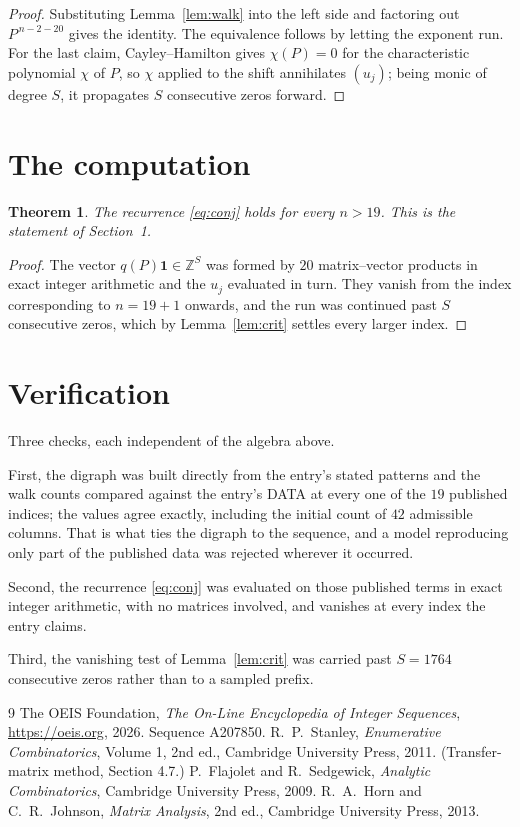 \documentclass[11pt,a4paper]{article}
\theoremstyle{plain}
\newtheorem{theorem}{Theorem}
\theoremstyle{definition}
\begin{document}
\begin{proof}
Substituting Lemma~\ref{lem:walk} into the left side and factoring out
$P^{\,n-2-20}$ gives the identity. The equivalence follows by letting the exponent
run. For the last claim, Cayley--Hamilton gives $\chi(P)=0$ for the characteristic
polynomial $\chi$ of $P$, so $\chi$ applied to the shift annihilates $(u_j)$; being monic of
degree $S$, it propagates $S$ consecutive zeros forward.
\end{proof}

\section{The computation}

\begin{theorem}
The recurrence \eqref{eq:conj} holds for every $n>19$. This is the statement of
Section~1.
\end{theorem}

\begin{proof}
The vector $q(P)\mathbf{1}\in\mathbb{Z}^{S}$ was formed by $20$ matrix--vector
products in exact integer arithmetic and the $u_j$ evaluated in turn. They vanish from the
index corresponding to $n=19+1$ onwards, and the run was continued past $S$ consecutive
zeros, which by Lemma~\ref{lem:crit} settles every larger index.
\end{proof}

\section{Verification}

Three checks, each independent of the algebra above.

First, the digraph was built directly from the entry's stated patterns and the walk counts
compared against the entry's DATA at every one of the $19$ published indices; the
values agree exactly, including the initial count of $42$ admissible columns. That is
what ties the digraph to the sequence, and a model reproducing only part of the published
data was rejected wherever it occurred.

Second, the recurrence \eqref{eq:conj} was evaluated on those published terms in exact
integer arithmetic, with no matrices involved, and vanishes at every index the entry claims.

Third, the vanishing test of Lemma~\ref{lem:crit} was carried past $S=1764$ consecutive
zeros rather than to a sampled prefix.

\begin{thebibliography}{9}
 The OEIS Foundation, \emph{The On-Line Encyclopedia of Integer
Sequences}, \url{https://oeis.org}, 2026. Sequence A207850.
 R.~P.~Stanley, \emph{Enumerative Combinatorics}, Volume 1, 2nd ed.,
Cambridge University Press, 2011. (Transfer-matrix method, Section 4.7.)
 P.~Flajolet and R.~Sedgewick, \emph{Analytic Combinatorics}, Cambridge
University Press, 2009.
 R.~A.~Horn and C.~R.~Johnson, \emph{Matrix Analysis}, 2nd ed., Cambridge
University Press, 2013.
\end{thebibliography}
\end{document}
